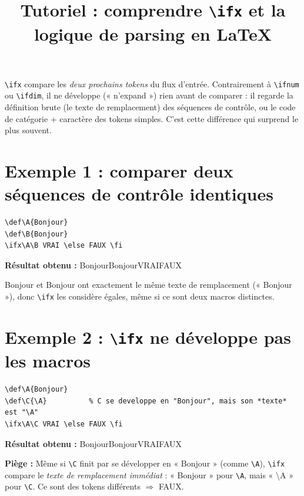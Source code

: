 \documentclass{article}
\title{Tutoriel : comprendre \texttt{\textbackslash ifx} et la logique de parsing en \LaTeX{}}
\author{}
\date{}
\newcommand{\Resultat}[1]{{\color{blue!60!black}\textbf{Résultat obtenu :} #1}\par}
\newcommand{\Piege}[1]{{\color{red!70!black}\textbf{Piège :} #1}\par}
\begin{document}
\maketitle

\noindent
\texttt{\textbackslash ifx} compare les \emph{deux prochains tokens} du flux
d'entrée. Contrairement à \texttt{\textbackslash ifnum} ou
\texttt{\textbackslash ifdim}, il ne développe (« n'expand ») rien avant de
comparer : il regarde la définition brute (le texte de remplacement) des
séquences de contrôle, ou le code de catégorie + caractère des tokens simples.
C'est cette différence qui surprend le plus souvent.

\section{Exemple 1 : comparer deux séquences de contrôle identiques}
\begin{verbatim}
\def\A{Bonjour}
\def\B{Bonjour}
\ifx\A\B VRAI \else FAUX \fi
\end{verbatim}

\def\A{Bonjour}
\def\B{Bonjour}
\Resultat{\ifx\A\B VRAI\else FAUX\fi}

\noindent
\A{} et \B{} ont exactement le même texte de remplacement (« Bonjour »),
donc \texttt{\textbackslash ifx} les considère égales, même si ce sont deux
macros distinctes.

\section{Exemple 2 : \texttt{\textbackslash ifx} ne développe pas les macros}
\begin{verbatim}
\def\A{Bonjour}
\def\C{\A}          % C se developpe en "Bonjour", mais son *texte* est "\A"
\ifx\A\C VRAI \else FAUX \fi
\end{verbatim}

\def\C{\A}
\Resultat{\ifx\A\C VRAI\else FAUX\fi}

\Piege{Même si \texttt{\textbackslash C} finit par se développer en
« Bonjour » (comme \texttt{\textbackslash A}), \texttt{\textbackslash ifx}
compare le \emph{texte de remplacement immédiat} : « Bonjour » pour
\texttt{\textbackslash A}, mais « \textbackslash A » pour
\texttt{\textbackslash C}. Ce sont des tokens différents $\Rightarrow$ FAUX.}

\end{document}
